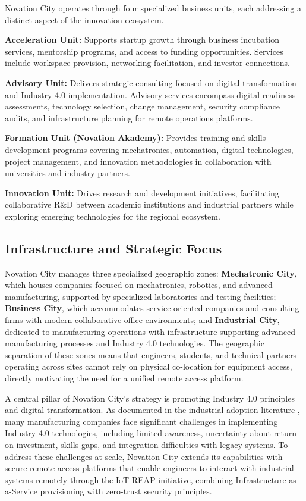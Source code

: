Novation City operates through four specialized business units, each addressing a
distinct aspect of the innovation ecosystem.

\textbf{Acceleration Unit:} Supports startup growth through business incubation
services, mentorship programs, and access to funding opportunities. Services include
workspace provision, networking facilitation, and investor connections.

\textbf{Advisory Unit:} Delivers strategic consulting focused on digital
transformation and Industry 4.0 implementation. Advisory services encompass digital
readiness assessments, technology selection, change management, security compliance
audits, and infrastructure planning for remote operations platforms.

\textbf{Formation Unit (Novation Akademy):} Provides training and skills development
programs covering mechatronics, automation, digital technologies, project management,
and innovation methodologies in collaboration with universities and industry partners.

\textbf{Innovation Unit:} Drives research and development initiatives, facilitating
collaborative R\&D between academic institutions and industrial partners while
exploring emerging technologies for the regional ecosystem.

\subsection{Infrastructure and Strategic Focus}

Novation City manages three specialized geographic zones: \textbf{Mechatronic City},
which houses companies focused on mechatronics, robotics, and advanced manufacturing,
supported by specialized laboratories and testing facilities; \textbf{Business City},
which accommodates service-oriented companies and consulting firms with modern
collaborative office environments; and \textbf{Industrial City}, dedicated to
manufacturing operations with infrastructure supporting advanced manufacturing
processes and Industry 4.0 technologies. The geographic separation of these zones
means that engineers, students, and technical partners operating across sites cannot
rely on physical co-location for equipment access, directly motivating the need for a
unified remote access platform.

A central pillar of Novation City's strategy is promoting Industry 4.0 principles and
digital transformation. As documented in the industrial adoption literature
{\footnotesize\cite{novationcity2026}}, many manufacturing companies face significant
challenges in implementing Industry 4.0 technologies, including limited awareness,
uncertainty about return on investment, skills gaps, and integration difficulties with
legacy systems. To address these challenges at scale, Novation City extends its
capabilities with secure remote access platforms that enable engineers to interact
with industrial systems remotely through the IoT-REAP initiative, combining
Infrastructure-as-a-Service provisioning with zero-trust security principles.

